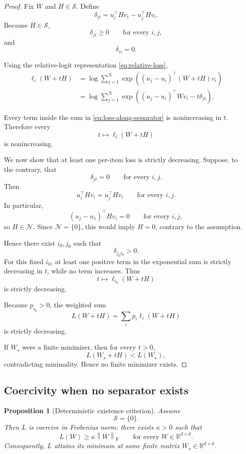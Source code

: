 \documentclass[11pt]{article}
\newtheorem{proposition}[theorem]{Proposition}
\newcommand{\R}{\mathbb{R}}
\newcommand{\F}{\mathrm{F}}
\newcommand{\norm}[1]{\left\lVert #1\right\rVert}
\newcommand{\cS}{\mathcal{S}}
\newcommand{\cN}{\mathcal{N}}
\newcommand{\1}{\mathbf{1}}
\begin{document}
\begin{proof}
Fix \(W\) and \(H\in\cS\). Define
\[
\delta_{ji}
=
u_i^\top Hv_i-u_j^\top Hv_i.
\]
Because \(H\in\cS\),
\[
\delta_{ji}\ge 0
\qquad
\text{for every }i,j,
\]
and
\[
\delta_{ii}=0.
\]

Using the relative-logit representation
\eqref{eq:relative-loss},
\begin{align}
\ell_i(W+tH)
&=
\log
\sum_{j=1}^{N}
\exp\left(
(u_j-u_i)^\top(W+tH)v_i
\right)
\nonumber\\
&=
\log
\sum_{j=1}^{N}
\exp\left(
(u_j-u_i)^\top Wv_i
-
t\delta_{ji}
\right).
\label{eq:loss-along-separator}
\end{align}

Every term inside the sum in \eqref{eq:loss-along-separator} is
nonincreasing in \(t\). Therefore every
\[
t\longmapsto \ell_i(W+tH)
\]
is nonincreasing.

We now show that at least one per-item loss is strictly decreasing.
Suppose, to the contrary, that
\[
\delta_{ji}=0
\qquad
\text{for every }i,j.
\]
Then
\[
u_i^\top Hv_i=u_j^\top Hv_i
\qquad
\text{for every }i,j.
\]
In particular,
\[
(u_j-u_1)^\top Hv_i=0
\qquad
\text{for every }i,j,
\]
so \(H\in\cN\). Since \(\cN=\{0\}\), this would imply \(H=0\), contrary
to the assumption.

Hence there exist \(i_0,j_0\) such that
\[
\delta_{j_0i_0}>0.
\]
For this fixed \(i_0\), at least one positive term in the exponential
sum is strictly decreasing in \(t\), while no term increases. Thus
\[
t\longmapsto \ell_{i_0}(W+tH)
\]
is strictly decreasing.

Because \(p_{i_0}>0\), the weighted sum
\[
L(W+tH)=\sum_i p_i\ell_i(W+tH)
\]
is strictly decreasing.

If \(W_\star\) were a finite minimizer, then for every \(t>0\),
\[
L(W_\star+tH)<L(W_\star),
\]
contradicting minimality. Hence no finite minimizer exists.
\end{proof}

\subsection{Coercivity when no separator exists}

\begin{proposition}[Deterministic existence criterion]
\label{prop:deterministic-existence}
Assume
\[
\cS=\{0\}.
\]
Then \(L\) is coercive in Frobenius norm: there exists
\(\kappa>0\) such that
\begin{equation}
L(W)\ge \kappa\norm{W}_{\F}
\qquad
\text{for every }W\in\R^{d\times d}.
\label{eq:coercive-bound}
\end{equation}
Consequently, \(L\) attains its minimum at some finite matrix
\(W_\star\in\R^{d\times d}\).
\end{proposition}
\end{document}
